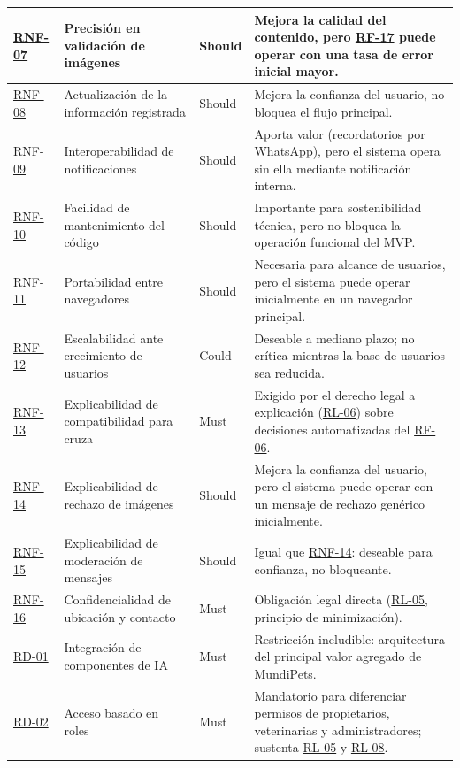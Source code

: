 \documentclass[journal,onecolumn]{IEEEtran}
\begin{document}
\begin{longtable}{@{}p{1.6cm} p{4.8cm} p{1.6cm} p{5.2cm}@{}}
		\hline
		\hyperref[tab:RNF-07]{RNF-07} & Precisión en validación de imágenes & Should & Mejora la calidad del contenido, pero \hyperref[tab:RF-17]{RF-17} puede operar con una tasa de error inicial mayor. \\
		\hline
		\hyperref[tab:RNF-08]{RNF-08} & Actualización de la información registrada & Should & Mejora la confianza del usuario, no bloquea el flujo principal. \\
		\hline
		\hyperref[tab:RNF-09]{RNF-09} & Interoperabilidad de notificaciones & Should & Aporta valor (recordatorios por WhatsApp), pero el sistema opera sin ella mediante notificación interna. \\
		\hline
		\hyperref[tab:RNF-10]{RNF-10} & Facilidad de mantenimiento del código & Should & Importante para sostenibilidad técnica, pero no bloquea la operación funcional del MVP. \\
		\hline
		\hyperref[tab:RNF-11]{RNF-11} & Portabilidad entre navegadores & Should & Necesaria para alcance de usuarios, pero el sistema puede operar inicialmente en un navegador principal. \\
		\hline
		\hyperref[tab:RNF-12]{RNF-12} & Escalabilidad ante crecimiento de usuarios & Could & Deseable a mediano plazo; no crítica mientras la base de usuarios sea reducida. \\
		\hline
		\hyperref[tab:RNF-13]{RNF-13} & Explicabilidad de compatibilidad para cruza & Must & Exigido por el derecho legal a explicación (\hyperref[rl:06]{RL-06}) sobre decisiones automatizadas del \hyperref[tab:RF-06]{RF-06}. \\
		\hline
		\hyperref[tab:RNF-14]{RNF-14} & Explicabilidad de rechazo de imágenes & Should & Mejora la confianza del usuario, pero el sistema puede operar con un mensaje de rechazo genérico inicialmente. \\
		\hline
		\hyperref[tab:RNF-15]{RNF-15} & Explicabilidad de moderación de mensajes & Should & Igual que \hyperref[tab:RNF-14]{RNF-14}: deseable para confianza, no bloqueante. \\
		\hline
		\hyperref[tab:RNF-16]{RNF-16} & Confidencialidad de ubicación y contacto & Must & Obligación legal directa (\hyperref[rl:05]{RL-05}, principio de minimización). \\
		\hline
		\hyperref[tab:RD-01]{RD-01} & Integración de componentes de IA & Must & Restricción ineludible: arquitectura del principal valor agregado de MundiPets. \\
		\hline
		\hyperref[tab:RD-02]{RD-02} & Acceso basado en roles & Must & Mandatorio para diferenciar permisos de propietarios, veterinarias y administradores; sustenta \hyperref[rl:05]{RL-05} y \hyperref[rl:08]{RL-08}. \\

\end{longtable}
\end{document}
